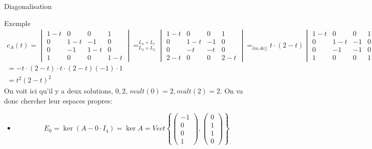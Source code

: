 \begin{parag}{Diagonalisation}
\begin{subparag}{Exemple}
\begin{align*}
        
        c_A(t) = \begin{vmatrix}
                1-t & 0 & 0 & 1\\
                0 & 1-t & -1 & 0\\
                0 & -1 & 1-t & 0\\
                1 & 0 & 0 & 1-t
            \end{vmatrix}=_{L_3 + L_2}^{L_4 + L_1} \begin{vmatrix}
                1-t & 0 & 0 & 1\\
                0 & 1-t & -1 & 0\\
                0 & -t & -t & 0\\
                2-t & 0 & 0 & 2-t
            \end{vmatrix}
            =_{lin. de ||}^{} t\cdot (2-t)\begin{vmatrix}
                1-t & 0 & 0 & 1\\
                0 & 1-t & -1 & 0\\
                0 & -1 & -1 & 0\\
                1 & 0 & 0 & 1
            \end{vmatrix} = t\cdot (2-t)\cdot t\begin{vmatrix}
                2-t & -1 & 0 \\
                0 & -1 & 0 \\
                0 & 0 & 1
            \end{vmatrix}\\
            = -t\cdot(2-t)\cdot t \cdot (2-t)(-1)\cdot 1\\
            = t^2(2-t)^2
            \end{align*}
            On voit ici qu'il y a deux solutions, $0, 2$, $mult(0) = 2, mult(2)=2$. On va donc chercher leur espaces propres:
            \begin{itemize}
                \item \[E_0 = \ker(A - 0\cdot I_4) = \ker A = Vect\left\{\begin{pmatrix}
                    -1\\0\\0\\1
                \end{pmatrix}, \begin{pmatrix}
                    0\\1\\1\\0
                \end{pmatrix}\right\}\]

\end{itemize}
\end{subparag}
\end{parag}

